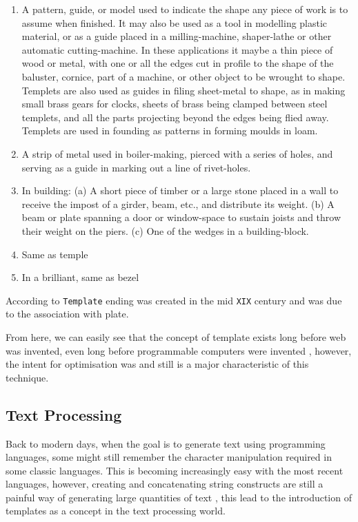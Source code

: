\begin{itemize}
\begin{bookQuote}
     \begin{enumerate}
         \item A pattern, guide, or model used to indicate the shape any piece of work is to assume when finished. It may also be used as a tool in modelling plastic material, or as a guide placed in a milling-machine, shaper-lathe or other automatic cutting-machine. In these applications it maybe a thin piece of wood or metal, with one or all the edges cut in profile to the shape of the baluster, cornice, part of a machine, or other object to be wrought to shape. Templets are also used as guides in filing sheet-metal to shape, as in making small brass gears for clocks, sheets of brass being clamped between steel templets, and all the parts projecting beyond the edges being flied away. Templets are used in founding as patterns in forming moulds in loam.
         
         \item A strip of metal used in boiler-making, pierced with a series of holes, and serving as a guide in marking out a line of rivet-holes.
         \item In building: (a) A short piece of timber or a large stone placed in a wall to receive the impost of a girder, beam, etc., and distribute its weight. (b) A beam or plate spanning a door or window-space to sustain joists and throw their weight on the piers. (c) One of the wedges in a building-block.
         \item Same as temple
         \item In a brilliant, same as bezel
     \end{enumerate}
\end{bookQuote}

According to \cite{Barnhart1988TheEtymology} \texttt{Template} ending was created in the mid \texttt{XIX} century and was due to the association with plate. 

From here, we can easily see that the concept of template exists long before web was invented, even long before programmable computers were invented \cite{Clements2014ComputerVariations}, however, the intent for optimisation was and still is a major characteristic of this technique.

\subsection{Text Processing}

Back to modern days, when the goal is to generate text using programming languages, some might still remember the character manipulation required in some classic languages. This is becoming increasingly easy with the most recent languages, however, creating and concatenating string constructs are still a painful way of generating large quantities of text \cite{Fowler2003PatternsArchitecture}, this lead to the introduction of templates as a concept in the text processing world.


\end{itemize}
